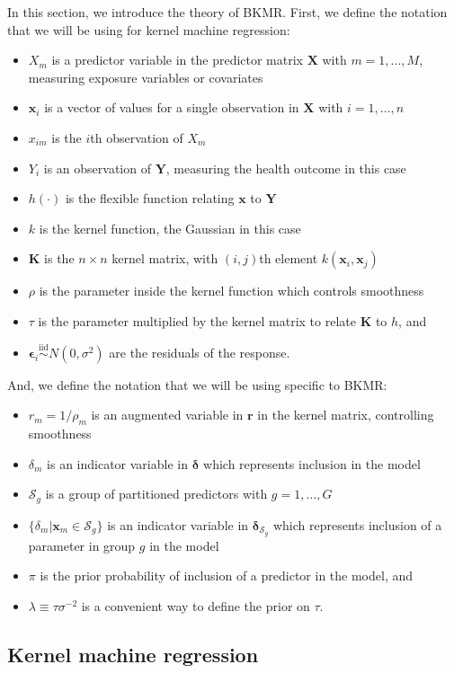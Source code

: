 \documentclass[12pt, twoside]{amherstthesis}
\providecommand{\tightlist}{%
  \setlength{\itemsep}{0pt}\setlength{\parskip}{0pt}}
\begin{document}
In this section, we introduce the theory of BKMR. First, we define the notation that we will be using for kernel machine regression:
\begin{itemize}
\tightlist
\item
  \(X_m\) is a predictor variable in the predictor matrix \(\textbf{X}\) with \(m = 1, \dots, M\), measuring exposure variables or covariates
\item
  \(\textbf{x}_i\) is a vector of values for a single observation in \(\textbf{X}\) with \(i = 1, \dots, n\)
\item
  \(x_{im}\) is the \(i\)th observation of \(X_m\)
\item
  \(Y_i\) is an observation of \(\textbf{Y}\), measuring the health outcome in this case
\item
  \(h(\cdot)\) is the flexible function relating \(\textbf{x}\) to \(\textbf{Y}\)
\item
  \(k\) is the kernel function, the Gaussian in this case
\item
  \(\textbf{K}\) is the \(n \times n\) kernel matrix, with \((i, j)\)th element \(k(\textbf{x}_i, \textbf{x}_j)\)
\item
  \(\rho\) is the parameter inside the kernel function which controls smoothness
\item
  \(\tau\) is the parameter multiplied by the kernel matrix to relate \(\textbf{K}\) to \(h\), and
\item
  \(\boldsymbol\epsilon_i \overset{\mathrm{iid}}{\sim} N(0, \sigma^2)\) are the residuals of the response.
\end{itemize}
And, we define the notation that we will be using specific to BKMR:
\begin{itemize}
\tightlist
\item
  \(r_m=1/\rho_m\) is an augmented variable in \(\textbf{r}\) in the kernel matrix, controlling smoothness
\item
  \(\delta_m\) is an indicator variable in \(\boldsymbol\delta\) which represents inclusion in the model
\item
  \(\mathcal{S}_g\) is a group of partitioned predictors with \({g=1,\dots,G}\)
\item
  \(\{\delta_m|\textbf{x}_m \in{\mathcal{S}_g}\}\) is an indicator variable in \(\boldsymbol\delta_{\mathcal{S}_g}\) which represents inclusion of a parameter in group \(g\) in the model
\item
  \(\pi\) is the prior probability of inclusion of a predictor in the model, and
\item
  \(\lambda \equiv \tau\sigma^{-2}\) is a convenient way to define the prior on \(\tau\).
\end{itemize}
\hypertarget{kernel-machine-regression}{%
\subsection{Kernel machine regression}\label{kernel-machine-regression}}
\end{document}
